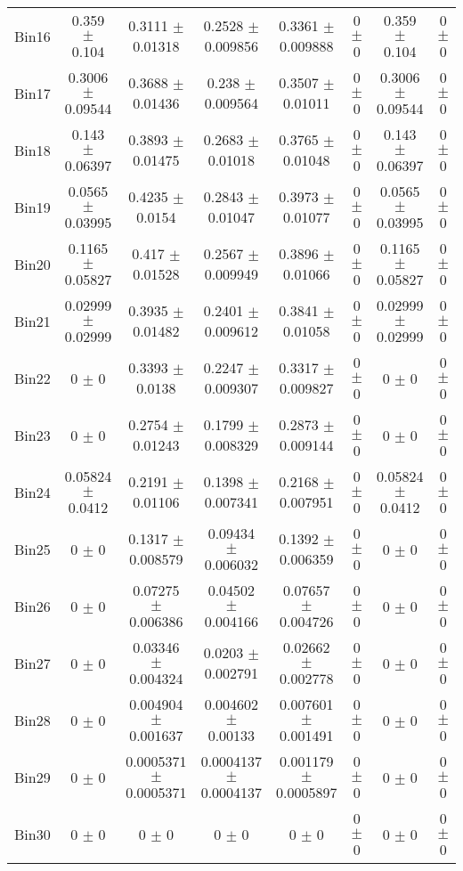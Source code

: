 \begin{tabular}{@{\extracolsep{4pt}}lccccccc@{}}
     Bin16 & 0.359 $\pm$ 0.104 & 0.3111 $\pm$ 0.01318 & 0.2528 $\pm$ 0.009856 & 0.3361 $\pm$ 0.009888 & 0 $\pm$ 0 & 0.359 $\pm$ 0.104 & 0 $\pm$ 0 \\ 
     Bin17 & 0.3006 $\pm$ 0.09544 & 0.3688 $\pm$ 0.01436 & 0.238 $\pm$ 0.009564 & 0.3507 $\pm$ 0.01011 & 0 $\pm$ 0 & 0.3006 $\pm$ 0.09544 & 0 $\pm$ 0 \\ 
     Bin18 & 0.143 $\pm$ 0.06397 & 0.3893 $\pm$ 0.01475 & 0.2683 $\pm$ 0.01018 & 0.3765 $\pm$ 0.01048 & 0 $\pm$ 0 & 0.143 $\pm$ 0.06397 & 0 $\pm$ 0 \\ 
     Bin19 & 0.0565 $\pm$ 0.03995 & 0.4235 $\pm$ 0.0154 & 0.2843 $\pm$ 0.01047 & 0.3973 $\pm$ 0.01077 & 0 $\pm$ 0 & 0.0565 $\pm$ 0.03995 & 0 $\pm$ 0 \\ 
     Bin20 & 0.1165 $\pm$ 0.05827 & 0.417 $\pm$ 0.01528 & 0.2567 $\pm$ 0.009949 & 0.3896 $\pm$ 0.01066 & 0 $\pm$ 0 & 0.1165 $\pm$ 0.05827 & 0 $\pm$ 0 \\ 
     Bin21 & 0.02999 $\pm$ 0.02999 & 0.3935 $\pm$ 0.01482 & 0.2401 $\pm$ 0.009612 & 0.3841 $\pm$ 0.01058 & 0 $\pm$ 0 & 0.02999 $\pm$ 0.02999 & 0 $\pm$ 0 \\ 
     Bin22 & 0 $\pm$ 0 & 0.3393 $\pm$ 0.0138 & 0.2247 $\pm$ 0.009307 & 0.3317 $\pm$ 0.009827 & 0 $\pm$ 0 & 0 $\pm$ 0 & 0 $\pm$ 0 \\ 
     Bin23 & 0 $\pm$ 0 & 0.2754 $\pm$ 0.01243 & 0.1799 $\pm$ 0.008329 & 0.2873 $\pm$ 0.009144 & 0 $\pm$ 0 & 0 $\pm$ 0 & 0 $\pm$ 0 \\ 
     Bin24 & 0.05824 $\pm$ 0.0412 & 0.2191 $\pm$ 0.01106 & 0.1398 $\pm$ 0.007341 & 0.2168 $\pm$ 0.007951 & 0 $\pm$ 0 & 0.05824 $\pm$ 0.0412 & 0 $\pm$ 0 \\ 
     Bin25 & 0 $\pm$ 0 & 0.1317 $\pm$ 0.008579 & 0.09434 $\pm$ 0.006032 & 0.1392 $\pm$ 0.006359 & 0 $\pm$ 0 & 0 $\pm$ 0 & 0 $\pm$ 0 \\ 
     Bin26 & 0 $\pm$ 0 & 0.07275 $\pm$ 0.006386 & 0.04502 $\pm$ 0.004166 & 0.07657 $\pm$ 0.004726 & 0 $\pm$ 0 & 0 $\pm$ 0 & 0 $\pm$ 0 \\ 
     Bin27 & 0 $\pm$ 0 & 0.03346 $\pm$ 0.004324 & 0.0203 $\pm$ 0.002791 & 0.02662 $\pm$ 0.002778 & 0 $\pm$ 0 & 0 $\pm$ 0 & 0 $\pm$ 0 \\ 
     Bin28 & 0 $\pm$ 0 & 0.004904 $\pm$ 0.001637 & 0.004602 $\pm$ 0.00133 & 0.007601 $\pm$ 0.001491 & 0 $\pm$ 0 & 0 $\pm$ 0 & 0 $\pm$ 0 \\ 
     Bin29 & 0 $\pm$ 0 & 0.0005371 $\pm$ 0.0005371 & 0.0004137 $\pm$ 0.0004137 & 0.001179 $\pm$ 0.0005897 & 0 $\pm$ 0 & 0 $\pm$ 0 & 0 $\pm$ 0 \\ 
     Bin30 & 0 $\pm$ 0 & 0 $\pm$ 0 & 0 $\pm$ 0 & 0 $\pm$ 0 & 0 $\pm$ 0 & 0 $\pm$ 0 & 0 $\pm$ 0 \\ 
\hline\hline
  \end{tabular}

